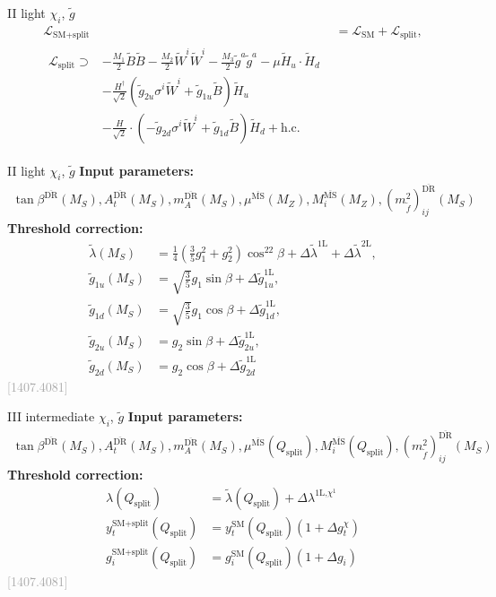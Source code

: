 \documentclass[hyperref={pdfpagelabels=false},ngerman]{beamer}
\newcommand{\MS}{\ensuremath{M_S}}
\newcommand{\bigcite}[1]{\textcolor{darkgray}{[#1]}}
\renewcommand{\emph}{\textbf}
\newcommand{\DRbar}{\ensuremath{\overline{\text{DR}}}}
\newcommand{\MSbar}{\ensuremath{\overline{\text{MS}}}}
\newcommand{\SM}{\ensuremath{\text{SM}}}
\newcommand{\SplitMSSM}{\ensuremath{\text{SM+split}}\xspace}
\newcommand{\hc}{\ensuremath{\text{h.c.}}}
\newcommand{\Qsplit}{\ensuremath{Q_\text{split}}\xspace}
\newcommand{\Lag}{\ensuremath{\mathcal{L}}}
\newcommand{\DlSplitMSSM}[1]{\ensuremath{\Delta\tilde{\lambda}^{\text{#1L}}}}
\newcommand{\gSplitMSSM}[1]{\ensuremath{\tilde{g}_{#1}}}
\newcommand{\DgSplitMSSM}[1]{\ensuremath{\Delta\tilde{g}_{#1}^{\text{1L}}}}
\begin{document}
\begin{frame}[noframenumbering]{II light $\chi_i$, $\tilde{g}$}
\begin{align*}
  \Lag_{\SplitMSSM} &= \Lag_{\SM} + \Lag_\text{split}, \\
\begin{split}
  \Lag_\text{split} \supset
  &- \frac{M_1}{2} \tilde{B}\tilde{B}
  - \frac{M_2}{2} \tilde{W}^i\tilde{W}^i
  - \frac{M_3}{2} \tilde{g}^a\tilde{g}^a
  - \mu \tilde{H}_u\cdot \tilde{H}_d \\
  &-\frac{H^\dagger}{\sqrt{2}} \left(
    \gSplitMSSM{2u} \sigma^i\tilde{W}^i + \gSplitMSSM{1u} \tilde{B}
  \right)\tilde{H}_u \\
  &-\frac{H}{\sqrt{2}} \cdot  \left(
    -\gSplitMSSM{2d} \sigma^i\tilde{W}^i + \gSplitMSSM{1d} \tilde{B}
  \right) \tilde{H}_d
  + \hc
\end{split}
\end{align*}
\end{frame}

\begin{frame}[noframenumbering]{II light $\chi_i$, $\tilde{g}$}
  \emph{Input parameters:}
  \begin{align*}
    \tan\beta^{\DRbar}(\MS), A_t^{\DRbar}(\MS), m_A^{\DRbar}(\MS),
    \mu^{\MSbar}(M_Z), M_i^{\MSbar}(M_Z),
    (m_{\tilde{f}}^2)^{\DRbar}_{ij}(\MS)
  \end{align*}
  \emph{Threshold correction:}
  \begin{align*}
    \tilde\lambda(\MS) &= \frac{1}{4}\left(\frac{3}{5} g_1^2 + g_2^2\right)
    \cos^22\beta + \DlSplitMSSM{1} + \DlSplitMSSM{2} ,\\
    \gSplitMSSM{1u}(\MS) &= \sqrt{\frac{3}{5}} g_1 \sin\beta + \DgSplitMSSM{1u},\\
    \gSplitMSSM{1d}(\MS) &= \sqrt{\frac{3}{5}} g_1 \cos\beta + \DgSplitMSSM{1d},\\
    \gSplitMSSM{2u}(\MS) &= g_2 \sin\beta + \DgSplitMSSM{2u},\\
    \gSplitMSSM{2d}(\MS) &= g_2 \cos\beta + \DgSplitMSSM{2d}
  \end{align*}
  \hfill\bigcite{1407.4081}
\end{frame}

\begin{frame}[noframenumbering]{III intermediate  $\chi_i$, $\tilde{g}$}
  \emph{Input parameters:}
  \begin{align*}
  \tan\beta^{\DRbar}(\MS), A_t^{\DRbar}(\MS), m_A^{\DRbar}(\MS),
  \mu^{\MSbar}(\Qsplit), M_i^{\MSbar}(\Qsplit),
  (m_{\tilde{f}}^2)^{\DRbar}_{ij}(\MS)
  \end{align*}
  \emph{Threshold correction:}
  \begin{align*}
  \lambda(\Qsplit) &= \tilde\lambda(\Qsplit) + \Delta\lambda^{\text{1L,}\chi^1} \\
  y_t^\SplitMSSM(\Qsplit) &= y_t^\SM(\Qsplit) (1 + \Delta g_t^\chi) \\
  g_i^\SplitMSSM(\Qsplit) &= g_i^\SM(\Qsplit) (1 + \Delta g_i)
  \end{align*}
  \hfill\bigcite{1407.4081}
\end{frame}
\end{document}
